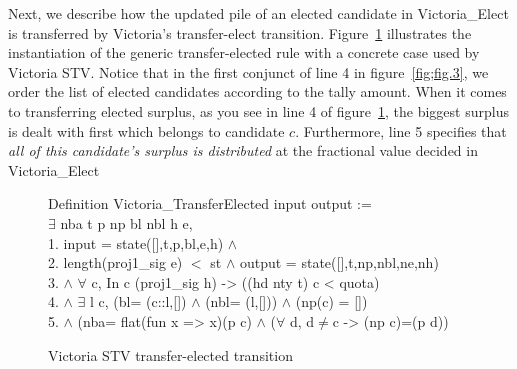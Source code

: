 \documentclass{llncs}
\begin{document}
Next, we describe how the updated pile of an elected candidate in {\selectfont Victoria\_Elect} is transferred by Victoria's transfer-elect transition.       
Figure~\ref{fig;fig.4} illustrates the instantiation of the generic transfer-elected rule with a concrete case used by Victoria STV. Notice that in the first conjunct of line 4 in figure~\ref{fig;fig.3}, we order the list of elected candidates according to the tally amount. When it comes to transferring elected surplus, as you see in line 4 of figure~\ref{fig;fig.4}, the biggest surplus is dealt with first which belongs to candidate $c$. Furthermore, line 5 specifies that  \emph{all of this candidate's surplus is distributed} at the fractional value decided in  {\selectfont Victoria\_Elect}
\begin{scriptsize}
\begin{figure}[h]
{\selectfont
 Definition Victoria\_TransferElected \textsf{input} \textsf{output} :=\\ $\exists$ nba t p np bl nbl h e, \\
     1. \textsf{input} = \textsf{state}([],t,p,bl,e,h) $\wedge$\\
     2. \textsf{length}(proj1\_sig e) $<$ st $\wedge$
     \textsf{output} = \textsf{state}([],t,np,nbl,ne,nh)\\
     3. $\wedge$ $\forall$ c, In c (proj1\_sig h) -> ((\textsf{hd} nty t) c < quota)\\
 4. $\wedge$ $\exists$ l c, (bl= (c::l,[]) $\wedge$ (nbl= (l,[])) $\wedge$ (np(c) = []) \\
 5. $\wedge$ (nba= \textsf{flat}(fun x => x)(p c) $\wedge$ ($\forall$ d, d$\neq$c -> (np c)=(p d))\\  
}
\caption{Victoria STV transfer-elected transition}
\label{fig;fig.4}
\end{figure}
\end{scriptsize}
\end{document}
